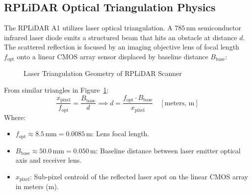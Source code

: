 \documentclass[11pt, a4paper]{article}
\begin{document}
\subsection{RPLiDAR Optical Triangulation Physics}
The RPLiDAR A1 utilizes laser optical triangulation. A $785\,\text{nm}$ semiconductor infrared laser diode emits a structured beam that hits an obstacle at distance $d$. The scattered reflection is focused by an imaging objective lens of focal length $f_{\text{opt}}$ onto a linear CMOS array sensor displaced by baseline distance $B_{\text{base}}$:

\begin{figure}[H]
\centering
{}
\caption{Laser Triangulation Geometry of RPLiDAR Scanner}
\label{fig:triangulation}
\end{figure}

From similar triangles in Figure~\ref{fig:triangulation}:
\begin{equation}
    \frac{x_{\text{pixel}}}{f_{\text{opt}}} = \frac{B_{\text{base}}}{d} \implies d = \frac{f_{\text{opt}} \cdot B_{\text{base}}}{x_{\text{pixel}}} \quad [\text{meters, m}]
\end{equation}
Where:
\begin{itemize}
    \item $f_{\text{opt}} \approx 8.5\,\text{mm} = 0.0085\,\text{m}$: Lens focal length.
    \item $B_{\text{base}} \approx 50.0\,\text{mm} = 0.050\,\text{m}$: Baseline distance between laser emitter optical axis and receiver lens.
    \item $x_{\text{pixel}}$: Sub-pixel centroid of the reflected laser spot on the linear CMOS array in meters ($\text{m}$).
\end{itemize}
\end{document}
